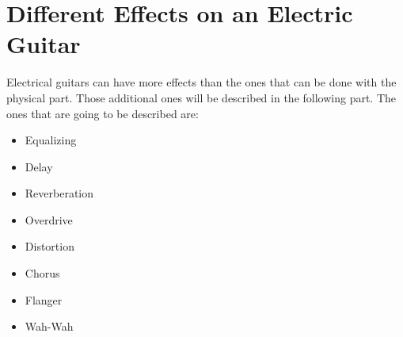 

\section{Different Effects on an Electric Guitar} \label{sec:effects}

Electrical guitars can have more effects than the ones that can be done with the physical part. Those additional ones will be described in the following part. The ones that are going to be described are:

\begin{itemize}
 \item Equalizing
 \item Delay
 \item Reverberation
 \item Overdrive
 \item Distortion
 \item Chorus
 \item Flanger
 \item Wah-Wah
\end{itemize}








